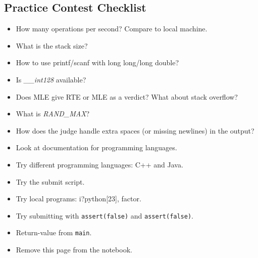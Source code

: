 \documentclass[9pt,a4paper,twocolumn,landscape,oneside]{amsart}
\newenvironment{myitemize}
{ \begin{itemize}[leftmargin=.5cm]
    \setlength{\itemsep}{0pt}
    \setlength{\parskip}{0pt}
    \setlength{\parsep}{0pt}     }
{ \end{itemize}                  }
\begin{document}
\begin{multicols*}{3}
        \subsection*{Practice Contest Checklist}
            \begin{myitemize}
                \item How many operations per second? Compare to local machine.
                \item What is the stack size?
                \item How to use printf/scanf with long long/long double?
                \item Is \textit{\_{}\_{}int128} available?
                \item Does MLE give RTE or MLE as a verdict? What about stack overflow?
                \item What is \textit{RAND\_{}MAX}?
                \item How does the judge handle extra spaces (or missing newlines) in the output?
                \item Look at documentation for programming languages.
                \item Try different programming languages: C++ and Java.
                \item Try the submit script.
                \item Try local programs: i?python[23], factor.
                \item Try submitting with \texttt{assert(false)} and \texttt{assert(false)}.
                \item Return-value from \texttt{main}.
                \item Remove this page from the notebook.
            \end{myitemize}
\end{multicols*}
\end{document}
